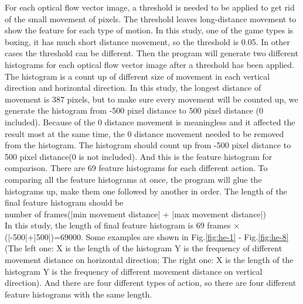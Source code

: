 \documentclass[runningheads,a4paper]{llncs}
\begin{document}
		For each optical flow vector image, a threshold is needed to be applied to get rid of the small movement of pixels. The threshold leaves long-distance movement to show the feature for each type of motion. In this study, one of the game types is boxing, it has much short distance movement, so the threshold is 0.05. In other cases the threshold can be different. Then the program will generate two different histograms for each optical flow vector image after a threshold has been applied. The histogram is a count up of different size of movement in each vertical direction and horizontal direction. In this study, the longest distance of movement is 387 pixels, but to make sure every movement will be counted up, we generate the histogram from -500 pixel distance to 500 pixel distance (0 included). Because of the 0 distance movement is meaningless and it affected the result most at the same time, the 0 distance movement needed to be removed from the histogram. The histogram should count up from -500 pixel distance to 500 pixel distance(0 is not included). And this is the feature histogram for comparison. There are 69 feature histograms for each different action. To comparing all the feature histograms at once, the program will glue the histograms up, make them one followed by another in order. The length of the final feature histogram should be\\
		number of frames(|min movement distance| + |max movement distance|) \\
		In this study, the length of final feature histogram is 69 frames $\times$ (|-500|+|500|)=69000. Some examples are shown in Fig.\ref{fig:he-1} - Fig.\ref{fig:he-8} (The left one: X is the length of the histogram Y is the frequency of different movement distance on horizontal direction; The right one: X is the length of the histogram Y is the frequency of different movement distance on vertical direction). And there are four different types of action, so there are four different feature histograms with the same length.
\end{document}
